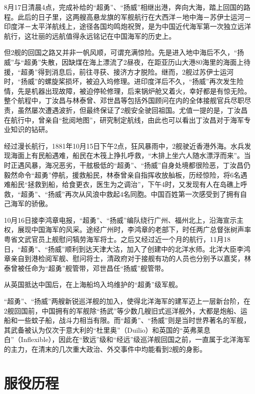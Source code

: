 \documentclass[12pt,UTF8]{ctexbook}
\begin{document}
8月17日清晨4点，完成补给的“超勇”、“扬威”相继出港，奔向大海，踏上回国的路程。此后的日子里，这两艘高悬龙旗的军舰航行在大西洋－地中海－苏伊士运河－印度洋－太平洋航线上，途径各国均鸣炮祝贺，是为中国近代海军第一次独立远洋航行，这壮丽的远航值得永远铭记在中国海军的历史上。

但2舰的回国之路又并非一帆风顺，可谓充满惊险。先是进入地中海后不久，“扬威”与“超勇”失散，因缺煤在海上漂流了2昼夜，在距亚历山大港80海里的海面上待援，“超勇”得到消息后，前往寻获、接济方才脱险。继而，2舰过苏伊士运河时，“扬威”的螺旋桨损坏，被迫入坞修理。进印度洋后不久，“扬威”再次发生险情，先是机器出现故障，被迫停轮修理，后来锅炉舱又着火，幸好都是有惊无险。整个航程中，丁汝昌与林泰曾、邓世昌等包括外国顾问在内的全体接舰官兵尽职尽责，虽然屡次遭遇波折，但最终保证了2舰安全驶回祖国。尤值一提的是，丁汝昌在航行中，曾亲自“批阅地图”，研究制定航线，由此也可以看出丁汝昌对于海军专业知识的钻研。

经过漫长航行，1881年10月15日下午2点，狂风暴雨中，2舰驶近香港外海。水兵发现海面上有民船遇难，船民在木筏上挣扎呼救，“木排上坐六人随水漂浮而来”。当时正遇风暴，海况恶劣，干舷极低的“超勇”、“扬威”自身处境都很险恶，丁汝昌仍毅然命令“超勇”停航，援救船民，林泰曾亲自指挥收放舢板，历经惊险，将6名遇难船民“拯救到船，给食更衣，医生为之调治”，下午4时，又发现有人在岛礁上呼救，“超勇”、“扬威”再次从风浪中救起4名同胞。中国百姓第一次感受到了拥有自己海军的骄傲。

10月16日接李鸿章电报，“超勇”、“扬威”编队绕行广州、福州北上，沿海宣示主权，展现中国海军的风采。途经广州时，李鸿章的老部下，时任两广总督张树声率粤省文武官员上舰慰问犒劳海军将士。之后又经过近一个月的航行，11月18日，“超勇”、“扬威”顺利到达天津大沽，加入了创建中的北洋水师。北洋大臣李鸿章亲自到港检阅军舰、慰问将士，清政府对于接舰有功的人员也分别予以嘉奖，林泰曾被任命为“超勇”舰管带，邓世昌任“扬威”舰管带。

从英国抵达中国后，在上海船坞入坞维护的“超勇”级军舰。

“超勇”、“扬威”两艘新锐巡洋舰的加入，使得北洋海军的建军迈上一层新台阶，在2舰回国前，中国拥有的军舰除“扬武”等少数几艘旧式巡洋舰外，大都是炮船、运船和一些蚊子船，战斗力相当有限。而“超勇”、“扬威”则是当时世界著名的军舰，其武备被认为仅次于意大利的“杜里奥”（Duilio）和英国的“英弗莱息白”（Inflexible），因此在“致远”级和“经远”级巡洋舰回国之前，一直属于北洋海军的主力，在清末的几次重大政治、外交事件中均能看到2舰的身影。

\section{服役历程}
\end{document}
